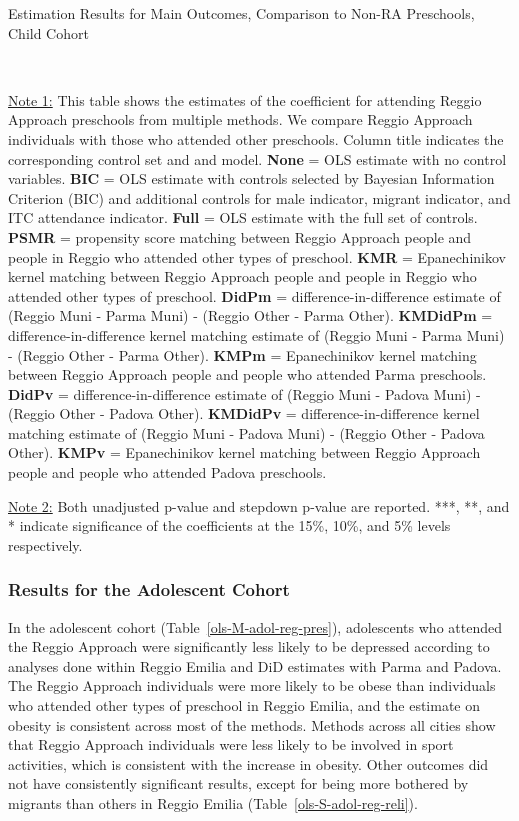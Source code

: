 \begin{table}[H] \caption{Estimation Results for Main Outcomes, Comparison to Non-RA Preschools, Child Cohort} \label{ols-M-child-reg-pres}
\scalebox{0.59}{}
\vspace{1ex} \\
\footnotesize\raggedright{\underline{Note 1:} This table shows the estimates of the coefficient for attending Reggio Approach preschools from multiple methods. We compare Reggio Approach individuals with those who attended other preschools. Column title indicates the corresponding control set and and model. \textbf{None} = OLS estimate with no control variables. \textbf{BIC} = OLS estimate with controls selected by Bayesian Information Criterion (BIC) and additional controls for male indicator, migrant indicator, and ITC attendance indicator. \textbf{Full} = OLS estimate with the full set of controls. \textbf{PSMR} =  propensity score matching between Reggio Approach people and people in Reggio who attended other types of preschool. \textbf{KMR} = Epanechinikov kernel matching between Reggio Approach people and people in Reggio who attended other types of preschool. \textbf{DidPm} = difference-in-difference estimate of (Reggio Muni - Parma Muni) - (Reggio Other - Parma Other). \textbf{KMDidPm} = difference-in-difference kernel matching estimate of (Reggio Muni - Parma Muni) - (Reggio Other - Parma Other).   \textbf{KMPm} = Epanechinikov kernel matching between Reggio Approach people and people who attended Parma preschools. \textbf{DidPv} = difference-in-difference estimate of (Reggio Muni - Padova Muni) - (Reggio Other - Padova Other). \textbf{KMDidPv} = difference-in-difference kernel matching estimate of (Reggio Muni - Padova Muni) - (Reggio Other - Padova Other).  \textbf{KMPv} = Epanechinikov kernel matching between Reggio Approach people and people who attended Padova preschools.}

\footnotesize\raggedright{\underline{Note 2:} Both unadjusted p-value and stepdown p-value are reported. ***, **, and * indicate significance of the coefficients at the 15\%, 10\%, and 5\% levels respectively.}

\end{table}

\subsubsection{Results for the Adolescent Cohort}
In the adolescent cohort (Table~\ref{ols-M-adol-reg-pres}), adolescents who attended the Reggio Approach were significantly less likely to be depressed according to analyses done within Reggio Emilia and DiD estimates with Parma and Padova. The Reggio Approach individuals were more likely to be obese than individuals who attended other types of preschool in Reggio Emilia, and the estimate on obesity is consistent across most of the methods. Methods across all cities show that Reggio Approach individuals were less likely to be involved in sport activities, which is consistent with the increase in obesity. Other outcomes did not have consistently significant results, except for being more bothered by migrants than others in Reggio Emilia (Table~\ref{ols-S-adol-reg-reli}).

